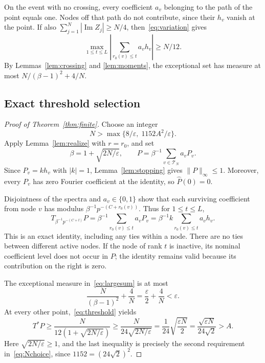 \documentclass[11pt]{amsart}
\theoremstyle{definition}
\theoremstyle{remark}
\newcommand{\T}{\mathcal T}
\DeclareMathOperator{\Impart}{Im}
\begin{document}
On the event with no crossing, every coefficient \(a_v\) belonging
to the path of the point equals one. Nodes off that path do not
contribute, since their \(h_v\) vanish at the point. If also
\(\sum_{j=1}^N|\Impart Z_j|\geq N/4\), then~\eqref{eq:variation} gives
\begin{equation}\label{eq:largesum}
 \max_{1\leq t\leq L}
 \left|\sum_{r_0(v)\leq t}a_vh_v\right|\geq N/12.
\end{equation}
By Lemmas~\ref{lem:crossing} and \ref{lem:moments}, the exceptional
set has measure at most \(N/(\beta-1)^2+4/N\).

\subsection{Exact threshold selection}

\begin{proof}[Proof of Theorem~\ref{thm:finite}]
Choose an integer
\begin{equation}\label{eq:Nchoice}
 N>\max\{8/\varepsilon,\;1152A^2/\varepsilon\}.
\end{equation}
Apply Lemma~\ref{lem:realize} with \(r=r_0\), and set
\[
 \beta=1+\sqrt{2N/\varepsilon},
 \qquad P=\beta^{-1}\sum_{v\in\T_N}a_vP_v.
\]
Since \(P_v=kh_v\) with \(|k|=1\),
Lemma~\ref{lem:stopping} gives \(\|P\|_\infty\leq1\).
Moreover, every \(P_v\) has zero Fourier coefficient at the identity,
so \(\widehat P(0)=0\).

Disjointness of the spectra and \(a_v\in\{0,1\}\) show that
each surviving coefficient from node \(v\) has modulus
\(\beta^{-1}p^{-(C+r_0(v))}\). Thus for \(1\leq t\leq L\),
\begin{equation}\label{eq:threshold}
 T_{\beta^{-1}p^{-(C+t)}}P
   =\beta^{-1}\sum_{r_0(v)\leq t}a_vP_v
   =\beta^{-1}k\sum_{r_0(v)\leq t}a_vh_v.
\end{equation}
This is an exact identity, including any ties within a node.
There are no ties between different active nodes.
If the node of rank \(t\) is inactive, its nominal coefficient level
does not occur in \(P\); the identity remains valid because its
contribution on the right is zero.

The exceptional measure in~\eqref{eq:largesum} is at most
\[
 \frac{N}{(\beta-1)^2}+\frac4N
   =\frac{\varepsilon}{2}+\frac4N<\varepsilon.
\]
At every other point,~\eqref{eq:threshold} yields
\[
 T^*P\geq\frac{N}{12(1+\sqrt{2N/\varepsilon})}
       \geq\frac{N}{24\sqrt{2N/\varepsilon}}
       =\frac1{24}\sqrt{\frac{\varepsilon N}{2}}
       =\frac{\sqrt{\varepsilon N}}{24\sqrt2}>A.
\]
Here \(\sqrt{2N/\varepsilon}\geq1\), and the last inequality
is precisely the second requirement in~\eqref{eq:Nchoice}, since
\(1152=(24\sqrt2)^2\).
\end{proof}
\end{document}
